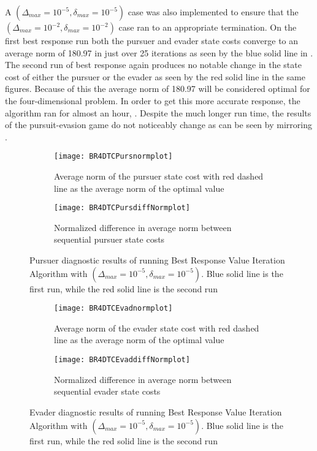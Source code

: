A $(\Delta_{max} = 10^{-5},\delta_{max} = 10^{-5})$ case was also implemented to ensure that the $(\Delta_{max} = 10^{-2},\delta_{max} = 10^{-2})$ case ran to an appropriate termination. On the first best response run both the pursuer and evader state costs converge to an average norm of 180.97 in just over 25 iterations as seen by the blue solid line in . The second run of best response again produces no notable change in the state cost of either the pursuer or the evader as seen by the red solid line in the same figures. Because of this the average norm of 180.97 will be considered optimal for the four-dimensional problem. In order to get this more accurate response, the algorithm ran for almost an hour, . Despite the much longer run time, the results of the pursuit-evasion game do not noticeably change as can be seen by  mirroring . 
\begin{figure}[h!]
\centering
\begin{subfigure}[t]{0.475\textwidth}
	\centering
	\texttt{[image: BR4DTCPursnormplot]}
	\caption{Average norm of the pursuer state cost with red dashed line as the average norm of the optimal value}
	\label{BR4DTCPnp}
\end{subfigure}
\hfill
\begin{subfigure}[t]{0.475\textwidth}
	\centering
	\texttt{[image: BR4DTCPursdiffNormplot]}
	\caption{Normalized difference in average norm between sequential pursuer state costs}
	\label{BR4DTCPdnp}
\end{subfigure}
\caption{Pursuer diagnostic results of running Best Response Value Iteration Algorithm with $(\Delta_{max} = 10^{-5},\delta_{max} = 10^{-5})$. Blue solid line is the first run, while the red solid line is the second run}
\label{BR4DTCPdiag}
\end{figure}
\begin{figure}[h!]
\centering
\begin{subfigure}[t]{0.475\textwidth}
	\centering
	\texttt{[image: BR4DTCEvadnormplot]}
	\caption{Average norm of the evader state cost with red dashed line as the average norm of the optimal value}
	\label{BR4DTCEnp}
\end{subfigure}
\hfill
\begin{subfigure}[t]{0.475\textwidth}
	\centering
	\texttt{[image: BR4DTCEvaddiffNormplot]}
	\caption{Normalized difference in average norm between sequential evader state costs}
	\label{BR4DTCEdnp}
\end{subfigure}
\caption{Evader diagnostic results of running Best Response Value Iteration Algorithm with $(\Delta_{max} = 10^{-5},\delta_{max} = 10^{-5})$. Blue solid line is the first run, while the red solid line is the second run}
\label{BR4DTCEdiag}
\end{figure}
